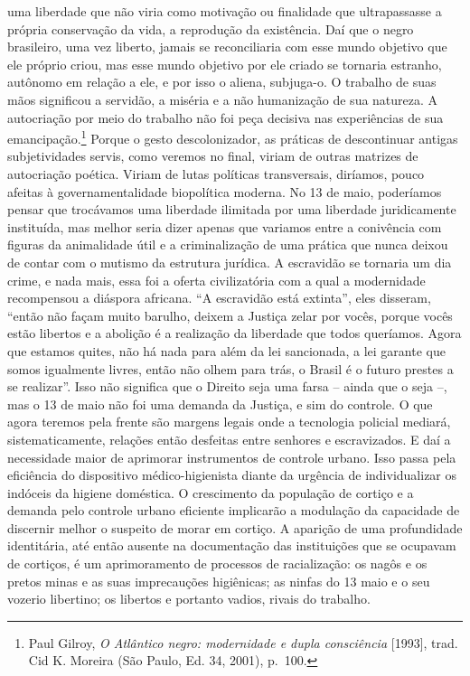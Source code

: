 uma liberdade que não viria como motivação ou finalidade que
ultrapassasse a própria conservação da vida, a reprodução da existência.
Daí que o negro brasileiro, uma vez liberto, jamais se reconciliaria com
esse mundo objetivo que ele próprio criou, mas esse mundo objetivo por
ele criado se tornaria estranho, autônomo em relação a ele, e por isso o
aliena, subjuga-o. O trabalho de suas mãos significou a servidão, a
miséria e a não humanização de sua natureza. A autocriação por meio do
trabalho não foi peça decisiva nas experiências de sua
emancipação.\footnote{Paul Gilroy, \emph{O Atlântico negro: modernidade
  e dupla consciência} {[}1993{]}, trad. Cid K. Moreira (São Paulo, Ed.
  34, 2001), p.~100.} Porque o gesto descolonizador, as práticas de
descontinuar antigas subjetividades servis, como veremos no final,
viriam de outras matrizes de autocriação poética. Viriam de lutas
políticas transversais, diríamos, pouco afeitas à governamentalidade
biopolítica moderna. No 13 de maio, poderíamos pensar que trocávamos uma
liberdade ilimitada por uma liberdade juridicamente instituída, mas
melhor seria dizer apenas que variamos entre a conivência com figuras da
animalidade útil e a criminalização de uma prática que nunca deixou de
contar com o mutismo da estrutura jurídica. A escravidão se tornaria um
dia crime, e nada mais, essa foi a oferta civilizatória com a qual a
modernidade recompensou a diáspora africana. ``A escravidão está
extinta'', eles disseram, ``então não façam muito barulho, deixem a
Justiça zelar por vocês, porque vocês estão libertos e a abolição é a
realização da liberdade que todos queríamos. Agora que estamos quites,
não há nada para além da lei sancionada, a lei garante que somos
igualmente livres, então não olhem para trás, o Brasil é o futuro
prestes a se realizar''. Isso não significa que o Direito seja uma farsa
-- ainda que o seja --, mas o 13 de maio não foi uma demanda da Justiça,
e sim do controle. O que agora teremos pela frente são margens legais
onde a tecnologia policial mediará, sistematicamente, relações então
desfeitas entre senhores e escravizados. E daí a necessidade maior de
aprimorar instrumentos de controle urbano. Isso passa pela eficiência do
dispositivo médico-higienista diante da urgência de individualizar os
indóceis da higiene doméstica. O crescimento da população de cortiço e a
demanda pelo controle urbano eficiente implicarão a modulação da
capacidade de discernir melhor o suspeito de morar em cortiço. A
aparição de uma profundidade identitária, até então ausente na
documentação das instituições que se ocupavam de cortiços, é um
aprimoramento de processos de racialização: os nagôs e os pretos minas e
as suas imprecauções higiênicas; as ninfas do 13 maio e o seu vozerio
libertino; os libertos e portanto vadios, rivais do trabalho.

